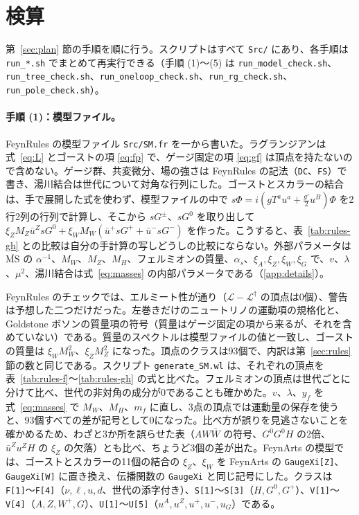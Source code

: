 \documentclass[a4paper,10pt]{ltjsarticle}
\newcommand{\MSbar}{\overline{\mathrm{MS}}}
\begin{document}
\section{検算}\label{sec:checks}

第~\ref{sec:plan} 節の手順を順に行う。スクリプトはすべて \texttt{Src/} にあり、各手順は \texttt{run\_*.sh} でまとめて再実行できる（手順 (1)〜(5) は \texttt{run\_model\_check.sh}、\texttt{run\_tree\_check.sh}、\texttt{run\_oneloop\_check.sh}、\texttt{run\_rg\_check.sh}、\texttt{run\_pole\_check.sh}）。

\paragraph{手順 (1)：模型ファイル。}FeynRules の模型ファイル \texttt{Src/SM.fr} を一から書いた。ラグランジアンは式~\eqref{eq:L} とゴーストの項 \eqref{eq:fp} で、ゲージ固定の項 \eqref{eq:gf} は頂点を持たないので含めない。ゲージ群、共変微分、場の強さは FeynRules の記法（\texttt{DC}、\texttt{FS}）で書き、湯川結合は世代について対角な行列にした。ゴーストとスカラーの結合は、手で展開した式を使わず、模型ファイルの中で $s\Phi=i(gT^au^a+\frac{g'}2u^B)\Phi$ を2行2列の行列で計算し、そこから $sG^\pm$、$sG^0$ を取り出して $\xi_ZM_Z\bar u^ZsG^0+\xi_WM_W(\bar u^+sG^++\bar u^-sG^-)$ を作った。こうすると、表~\ref{tab:rules-gh} との比較は自分の手計算の写しどうしの比較にならない。外部パラメータは $\MSbar$ の $\alpha^{-1}$、$M_W$、$M_Z$、$M_H$、フェルミオンの質量、$\alpha_s$、$\xi_A,\xi_Z,\xi_W,\xi_G$ で、$v$、$\lambda$、$\mu^2$、湯川結合は式~\eqref{eq:masses} の内部パラメータである（\ref{app:details}）。

FeynRules のチェックでは、エルミート性が通り（$\mathcal L-\mathcal L^\dagger$ の頂点は0個）、警告は予想した二つだけだった。左巻きだけのニュートリノの運動項の規格化と、Goldstone ボソンの質量項の符号（質量はゲージ固定の項から来るが、それを含めていない）である。質量のスペクトルは模型ファイルの値と一致し、ゴーストの質量は $\xi_WM_W^2$、$\xi_ZM_Z^2$ になった。頂点のクラスは93個で、内訳は第~\ref{sec:rules} 節の数と同じである。スクリプト \texttt{generate\_SM.wl} は、それぞれの頂点を表~\ref{tab:rules-f}〜\ref{tab:rules-gh} の式と比べた。フェルミオンの頂点は世代ごとに分けて比べ、世代の非対角の成分が0であることも確かめた。$v$、$\lambda$、$y_f$ を式~\eqref{eq:masses} で $M_W$、$M_H$、$m_f$ に直し、3点の頂点では運動量の保存を使うと、93個すべての差が記号として0になった。比べ方が誤りを見逃さないことを確かめるため、わざと3か所を誤らせた表（$AW\bar W$ の符号、$G^0G^0H$ の2倍、$\bar u^Zu^ZH$ の $\xi_Z$ の欠落）とも比べ、ちょうど3個の差が出た。FeynArts の模型では、ゴーストとスカラーの11個の結合の $\xi_Z$、$\xi_W$ を FeynArts の \texttt{GaugeXi[Z]}、\texttt{GaugeXi[W]} に置き換え、伝播関数の \texttt{GaugeXi} と同じ記号にした。クラスは \texttt{F[1]}〜\texttt{F[4]}（$\nu,\ell,u,d$、世代の添字付き）、\texttt{S[1]}〜\texttt{S[3]}（$H,G^0,G^+$）、\texttt{V[1]}〜\texttt{V[4]}（$A,Z,W^+,G$）、\texttt{U[1]}〜\texttt{U[5]}（$u^A,u^Z,u^+,u^-,u_G$）である。
\end{document}
